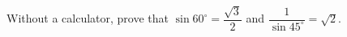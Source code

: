 Without a calculator, prove that $\sin60^\circ=\dfrac{\sqrt3}{2}$ and $\dfrac{1}{\sin45^\circ}=\sqrt2$.
